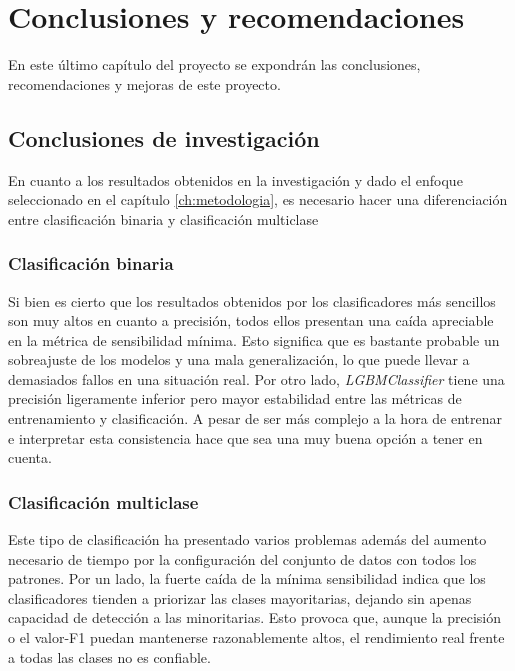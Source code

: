 \chapter{Conclusiones y recomendaciones}
\label{ch:conclusiones}

En este último capítulo del proyecto se expondrán las conclusiones, recomendaciones y mejoras de este proyecto.

\section{Conclusiones de investigación}
\label{sec:conc_investigacion}

En cuanto a los resultados obtenidos en la investigación y dado el enfoque seleccionado en el capítulo \ref{ch:metodologia}, es necesario hacer una diferenciación entre clasificación binaria y clasificación multiclase

\subsection{Clasificación binaria}
\label{subsec:conc_bin}

Si bien es cierto que los resultados obtenidos por los clasificadores más sencillos son muy altos en cuanto a precisión, todos ellos presentan una caída apreciable en la métrica de sensibilidad mínima. Esto significa que es bastante probable un sobreajuste de los modelos y una mala generalización, lo que puede llevar a demasiados fallos en una situación real. Por otro lado, \textit{LGBMClassifier} tiene una precisión ligeramente inferior pero mayor estabilidad entre las métricas de entrenamiento y clasificación. A pesar de ser más complejo a la hora de entrenar e interpretar esta consistencia hace que sea una muy buena opción a tener en cuenta.

\newpage
\subsection{Clasificación multiclase}
\label{subsec:conc_multi}

Este tipo de clasificación ha presentado varios problemas además del aumento necesario de tiempo por la configuración del conjunto de datos con todos los patrones. Por un lado, la fuerte caída de la mínima sensibilidad indica que los clasificadores tienden a priorizar las clases mayoritarias, dejando sin apenas capacidad de detección a las minoritarias. Esto provoca que, aunque la precisión o el valor-F1 puedan mantenerse razonablemente altos, el rendimiento real frente a todas las clases no es confiable.

